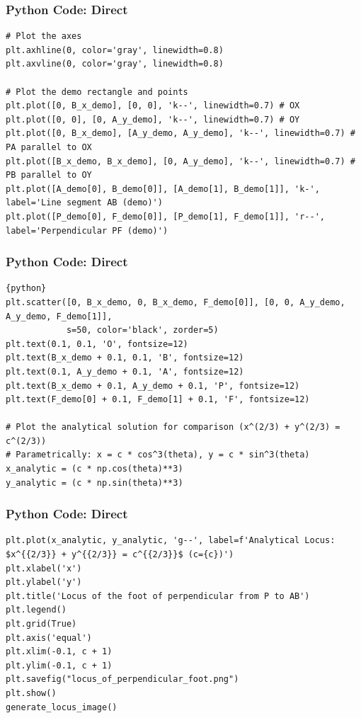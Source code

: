 \documentclass{beamer}
\begin{document}
\begin{frame}[fragile]
\frametitle{Python Code: Direct}
\begin{lstlisting}
# Plot the axes
plt.axhline(0, color='gray', linewidth=0.8)
plt.axvline(0, color='gray', linewidth=0.8)

# Plot the demo rectangle and points
plt.plot([0, B_x_demo], [0, 0], 'k--', linewidth=0.7) # OX
plt.plot([0, 0], [0, A_y_demo], 'k--', linewidth=0.7) # OY
plt.plot([0, B_x_demo], [A_y_demo, A_y_demo], 'k--', linewidth=0.7) # PA parallel to OX
plt.plot([B_x_demo, B_x_demo], [0, A_y_demo], 'k--', linewidth=0.7) # PB parallel to OY
plt.plot([A_demo[0], B_demo[0]], [A_demo[1], B_demo[1]], 'k-', label='Line segment AB (demo)')
plt.plot([P_demo[0], F_demo[0]], [P_demo[1], F_demo[1]], 'r--', label='Perpendicular PF (demo)')
\end{lstlisting}
\end{frame}

\begin{frame}[fragile]
\frametitle{Python Code: Direct}
\begin{lstlisting}{python}
plt.scatter([0, B_x_demo, 0, B_x_demo, F_demo[0]], [0, 0, A_y_demo, A_y_demo, F_demo[1]],
            s=50, color='black', zorder=5)
plt.text(0.1, 0.1, 'O', fontsize=12)
plt.text(B_x_demo + 0.1, 0.1, 'B', fontsize=12)
plt.text(0.1, A_y_demo + 0.1, 'A', fontsize=12)
plt.text(B_x_demo + 0.1, A_y_demo + 0.1, 'P', fontsize=12)
plt.text(F_demo[0] + 0.1, F_demo[1] + 0.1, 'F', fontsize=12)

# Plot the analytical solution for comparison (x^(2/3) + y^(2/3) = c^(2/3))
# Parametrically: x = c * cos^3(theta), y = c * sin^3(theta)
x_analytic = (c * np.cos(theta)**3)
y_analytic = (c * np.sin(theta)**3)
\end{lstlisting}
\end{frame}

\begin{frame}[fragile]
\frametitle{Python Code: Direct}
\begin{lstlisting}
plt.plot(x_analytic, y_analytic, 'g--', label=f'Analytical Locus: $x^{{2/3}} + y^{{2/3}} = c^{{2/3}}$ (c={c})')
plt.xlabel('x')
plt.ylabel('y')
plt.title('Locus of the foot of perpendicular from P to AB')
plt.legend()
plt.grid(True)
plt.axis('equal')
plt.xlim(-0.1, c + 1)
plt.ylim(-0.1, c + 1)
plt.savefig("locus_of_perpendicular_foot.png")
plt.show()
generate_locus_image()
\end{lstlisting}
\end{frame}
\end{document}
